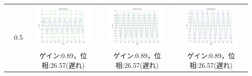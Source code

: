\documentclass[a4paper,11pt]{jsarticle}
\begin{document}
\begin{enumerate}
\begin{table}[H]
\begin{tabular}{|c|c|c|c|c|}
             &
            \multirow{2}{*}{0.5}
             &
            \begin{minipage}{45mm}
              \centering
              \includegraphics[width=3cm,clip]{picture/2.png}
            \end{minipage}
             &
            \begin{minipage}{45mm}
              \centering
              \includegraphics[width=3cm,clip]{picture/5.png}
            \end{minipage}
             &
            \begin{minipage}{45mm}
              \centering
              \includegraphics[width=3cm,clip]{picture/8.png}
            \end{minipage}
            \\\cline{3-5}


             &

             &
            ゲイン:0.89，位相:26.57(遅れ)
             &
            ゲイン:0.89，位相:26.57(遅れ)
             &
            ゲイン:0.89，位相:26.57(遅れ)
            \\\cline{2-5}



\end{tabular}
\end{table}
\end{enumerate}
\end{document}
